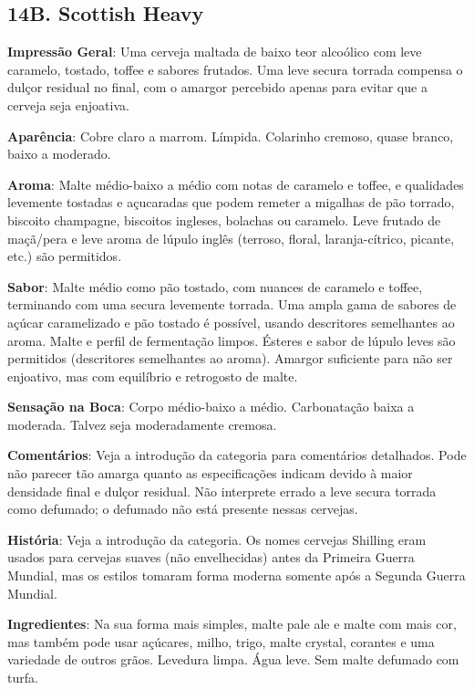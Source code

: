 \subsection*{14B. Scottish Heavy}

\textbf{Impressão Geral}: Uma cerveja maltada de baixo teor alcoólico com leve caramelo, tostado, toffee e sabores frutados. Uma leve secura torrada compensa o dulçor residual no final, com o amargor percebido apenas para evitar que a cerveja seja enjoativa.

\textbf{Aparência}: Cobre claro a marrom. Límpida. Colarinho cremoso, quase branco, baixo a moderado.

\textbf{Aroma}: Malte médio-baixo a médio com notas de caramelo e toffee, e qualidades levemente tostadas e açucaradas que podem remeter a migalhas de pão torrado, biscoito champagne, biscoitos ingleses, bolachas ou caramelo. Leve frutado de maçã/pera e leve aroma de lúpulo inglês (terroso, floral, laranja-cítrico, picante, etc.) são permitidos.

\textbf{Sabor}: Malte médio como pão tostado, com nuances de caramelo e toffee, terminando com uma secura levemente torrada. Uma ampla gama de sabores de açúcar caramelizado e pão tostado é possível, usando descritores semelhantes ao aroma. Malte e perfil de fermentação limpos. Ésteres e sabor de lúpulo leves são permitidos (descritores semelhantes ao aroma). Amargor suficiente para não ser enjoativo, mas com equilíbrio e retrogosto de malte.

\textbf{Sensação na Boca}: Corpo médio-baixo a médio. Carbonatação baixa a moderada. Talvez seja moderadamente cremosa.

\textbf{Comentários}: Veja a introdução da categoria para comentários detalhados. Pode não parecer tão amarga quanto as especificações indicam devido à maior densidade final e dulçor residual. Não interprete errado a leve secura torrada como defumado; o defumado não está presente nessas cervejas.

\textbf{História}: Veja a introdução da categoria. Os nomes cervejas Shilling eram usados para cervejas suaves (não envelhecidas) antes da Primeira Guerra Mundial, mas os estilos tomaram forma moderna somente após a Segunda Guerra Mundial.

\textbf{Ingredientes}: Na sua forma mais simples, malte pale ale e malte com mais cor, mas também pode usar açúcares, milho, trigo, malte crystal, corantes e uma variedade de outros grãos. Levedura limpa. Água leve. Sem malte defumado com turfa.

